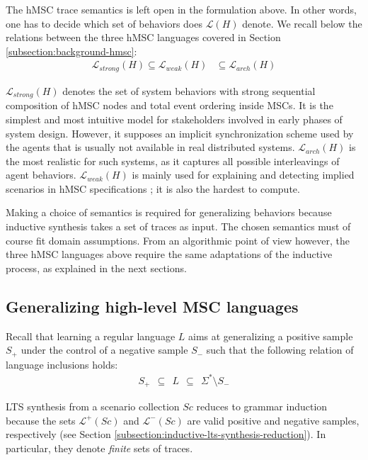The hMSC trace semantics is left open in the formulation above. In other words, one has to decide which set of behaviors does $\mathcal{L}(H)$ denote. We recall below the relations between the three hMSC languages covered in Section \ref{subsection:background-hmsc}: 
\begin{align}
\mathcal{L}_{strong}(H) \subseteq \mathcal{L}_{weak}(H) &\subseteq \mathcal{L}_{arch}(H)
\end{align}

$\mathcal{L}_{strong}(H)$ denotes the set of system behaviors with strong sequential composition of hMSC nodes and total event ordering inside MSCs. It is the simplest and most intuitive model for stakeholders involved in early phases of system design. However, it supposes an implicit synchronization scheme used by the agents that is usually not available in real distributed systems. $\mathcal{L}_{arch}(H)$ is the most realistic for such systems, as it captures all possible interleavings of agent behaviors. $\mathcal{L}_{weak}(H)$ is mainly used for explaining and detecting implied scenarios in hMSC specifications \cite{Uchitel:2003}; it is also the hardest to compute.

Making a choice of semantics is required for generalizing behaviors because inductive synthesis takes a set of traces as input. The chosen semantics must of course fit domain assumptions. From an algorithmic point of view however, the three hMSC languages above require the same adaptations of the inductive process, as explained in the next sections.

\subsection{Generalizing high-level MSC languages\label{subsection:hmsc-induction-algo-adaptation}}

Recall that learning a regular language $L$ aims at generalizing a positive sample $S_+$ under the control of a negative sample $S_-$ such that the following relation of language inclusions holds:
\begin{align}
S_+~~\subseteq~~L~~\subseteq~~\Sigma^*\setminus S_-
\end{align}

LTS synthesis from a scenario collection $Sc$ reduces to grammar induction because the sets $\mathcal{L}^+(Sc)$ and $\mathcal{L}^-(Sc)$ are valid positive and negative samples, respectively (see Section \ref{subsection:inductive-lts-synthesis-reduction}). In particular, they denote \emph{finite} sets of traces.

